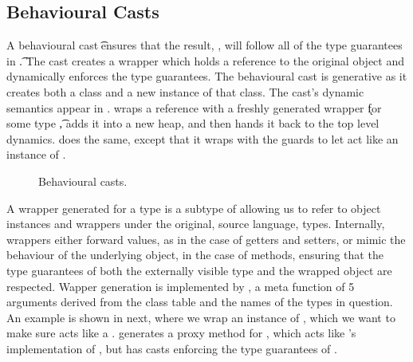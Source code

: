 \documentclass[acmlarge, anonymous, authordraft]{acmart}
\begin{document}
\subsection{Behavioural Casts}

A behavioural cast \BehCast\t\a ensures that the result, \ap, will follow
all of the type guarantees in \t. The cast creates a wrapper which holds a
reference to the original object \a and dynamically enforces the type
guarantees. The behavioural cast is generative as it creates both a class
and a new instance of that class. The cast's dynamic semantics appear in
.  wraps a reference \a with a freshly generated
wrapper \k for some type \t, adds it into a new heap, and then hands it back
to the top level dynamics.  does the same, except that it wraps
\a with the guards to let \a act like an instance of \any.

\begin{figure}[!ht]
\vspace{-2mm}

{  \small
  \begin{mathpar}

\end{mathpar}}  

\vspace{-2mm}
\caption{Behavioural casts.}\label{behave}
\end{figure}

A wrapper generated for a type \C is a subtype of \C allowing us to refer to
object instances and wrappers under the original, source language,
types. Internally, wrappers either forward values, as in the case of getters
and setters, or mimic the behaviour of the underlying object, in the case of
methods, ensuring that the type guarantees of both the externally visible
type and the wrapped object are respected.
Wapper generation is implemented by , a meta function of 5
arguments derived from the class table and the names of the types in
question.  An example is shown in next, where we wrap an
instance of \C, which we want to make sure acts like a \D. 
generates a proxy method for \m, which acts like \C's implementation of \m,
but has casts enforcing the type guarantees of \D.
\end{document}
